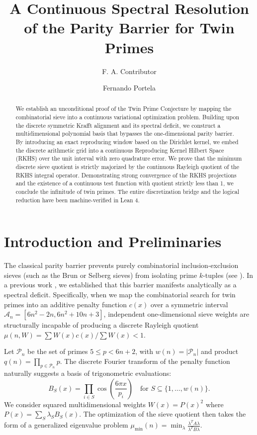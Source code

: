 \documentclass{aomart}
\title[A Continuous Spectral Resolution of the Parity Barrier]{A Continuous Spectral Resolution of the Parity Barrier for Twin Primes}
\author{F. A. Contributor}
\author{Fernando Portela}
\theoremstyle{definition}
\newcommand{\mathcalA}{\mathcal{A}}
\newcommand{\mathcalP}{\mathcal{P}}
\begin{document}
\begin{abstract}
We establish an unconditional proof of the Twin Prime Conjecture by mapping the combinatorial sieve
into a continuous variational optimization problem. Building upon the discrete symmetric Krafft
alignment and its spectral deficit, we construct a multidimensional polynomial basis that bypasses
the one-dimensional parity barrier. By introducing an exact reproducing window based on the Dirichlet
kernel, we embed the discrete arithmetic grid into a continuous Reproducing Kernel Hilbert Space
(RKHS) over the unit interval with zero quadrature error. We prove that the minimum discrete sieve
quotient is strictly majorized by the continuous Rayleigh quotient of the RKHS integral operator.
Demonstrating strong convergence of the RKHS projections and the existence of a continuous test
function with quotient strictly less than 1, we conclude the infinitude of twin primes. The entire
discretization bridge and the logical reduction have been machine-verified in Lean 4.
\end{abstract}

\maketitle

\section{Introduction and Preliminaries} \label{sec:intro}

The classical parity barrier prevents purely combinatorial inclusion-exclusion sieves (such as the
Brun or Selberg sieves) from isolating prime $k$-tuples (see \cite{Selberg1947, Maynard2015}). In a
previous work \cite{portela2026b}, we established that this barrier manifests analytically as a
spectral deficit. Specifically, when we map the combinatorial search for twin primes into an
additive penalty function $c(x)$ over a symmetric interval
$\mathcalA_n = [6n^2 - 2n, 6n^2 + 10n + 3]$, independent one-dimensional sieve weights are
structurally incapable of producing a discrete Rayleigh quotient
$\mu(n, W) = \sum W(x) c(x) / \sum W(x) < 1$.

Let $\mathcalP_n$ be the set of primes $5 \le p < 6n+2$, with $w(n) = |\mathcalP_n|$ and product
$q(n) = \prod_{p \in \mathcalP_n} p$. The discrete Fourier transform of the penalty function
naturally suggests a basis of trigonometric evaluations:
\[ B_S(x) = \prod_{i \in S} \cos\left( \frac{6\pi x}{p_i} \right) \quad \text{for } S \subseteq \{1, \dots, w(n)\}. \]
We consider squared multidimensional weights $W(x) = P(x)^2$ where
$P(x) = \sum_S \lambda_S B_S(x)$. The optimization of the sieve quotient then takes the form of a
generalized eigenvalue problem
$\mu_{\min}(n) = \min_{\lambda} \frac{\lambda^T A \lambda}{\lambda^T B \lambda}$.
\end{document}
